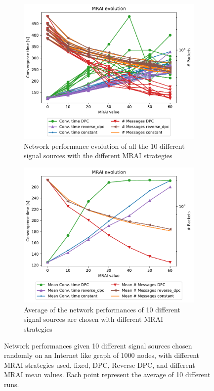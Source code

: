 \begin{figure}[h]
     \centering
     \begin{subfigure}[b]{0.49\textwidth}
         \centering
         \includegraphics[width=\textwidth]{images/position/different_destinations-1000_all.pdf}
		 \caption{Network performance evolution of all the \num{10} different signal sources
			with the different \ac{MRAI} strategies}
         \label{fig:different_destinations_all}
     \end{subfigure}
     \hfill
     \begin{subfigure}[b]{0.49\textwidth}
         \centering
         \includegraphics[width=\textwidth]{images/position/different_destinations-1000_mean.pdf}
		 \caption{Average of the network performances of \num{10} different
			signal sources are chosen with different \ac{MRAI} strategies}
         \label{fig:different_destinations_mean}
     \end{subfigure}
	 \caption{Network performances given \num{10} different signal sources chosen
		randomly on an Internet like graph of \num{1000} nodes, with different
		\ac{MRAI} strategies used, fixed, \ac{DPC}, Reverse \ac{DPC}, and
		different \ac{MRAI} mean values. Each point represent the average of
		\num{10} different runs.}
	 \label{fig:different_destinations}
\end{figure}

